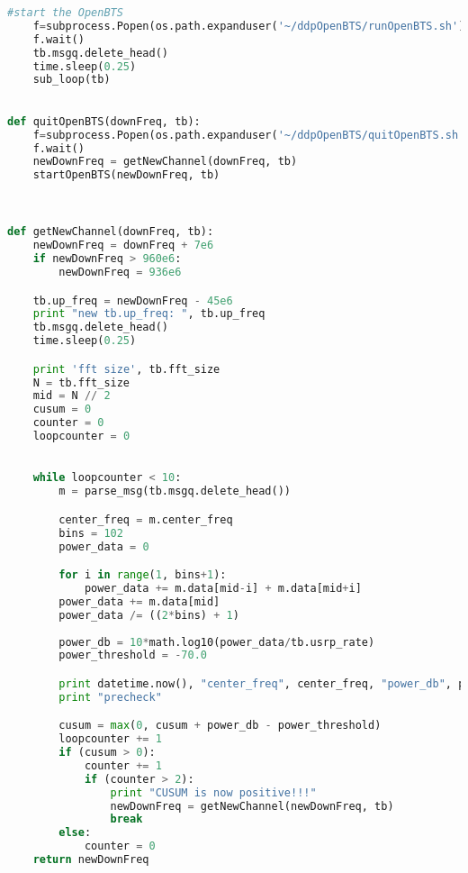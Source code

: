 \begin{lstlisting}[language=Python]
    #start the OpenBTS
    f=subprocess.Popen(os.path.expanduser('~/ddpOpenBTS/runOpenBTS.sh'))
    f.wait()
    tb.msgq.delete_head()
    time.sleep(0.25)
    sub_loop(tb)
              

def quitOpenBTS(downFreq, tb):
    f=subprocess.Popen(os.path.expanduser('~/ddpOpenBTS/quitOpenBTS.sh'))
    f.wait()    
    newDownFreq = getNewChannel(downFreq, tb)
    startOpenBTS(newDownFreq, tb)

        

def getNewChannel(downFreq, tb):
    newDownFreq = downFreq + 7e6
    if newDownFreq > 960e6:
        newDownFreq = 936e6

    tb.up_freq = newDownFreq - 45e6
    print "new tb.up_freq: ", tb.up_freq
    tb.msgq.delete_head()
    time.sleep(0.25)

    print 'fft size', tb.fft_size
    N = tb.fft_size
    mid = N // 2
    cusum = 0
    counter = 0
    loopcounter = 0
    

    while loopcounter < 10:
        m = parse_msg(tb.msgq.delete_head())

        center_freq = m.center_freq
        bins = 102
        power_data = 0

        for i in range(1, bins+1):
            power_data += m.data[mid-i] + m.data[mid+i]
        power_data += m.data[mid]
        power_data /= ((2*bins) + 1)
        
        power_db = 10*math.log10(power_data/tb.usrp_rate)
        power_threshold = -70.0

        print datetime.now(), "center_freq", center_freq, "power_db", power_db
        print "precheck"

        cusum = max(0, cusum + power_db - power_threshold)
        loopcounter += 1
        if (cusum > 0):
            counter += 1
            if (counter > 2):
                print "CUSUM is now positive!!!"
                newDownFreq = getNewChannel(newDownFreq, tb)
                break
        else:
            counter = 0
    return newDownFreq
\end{lstlisting}




